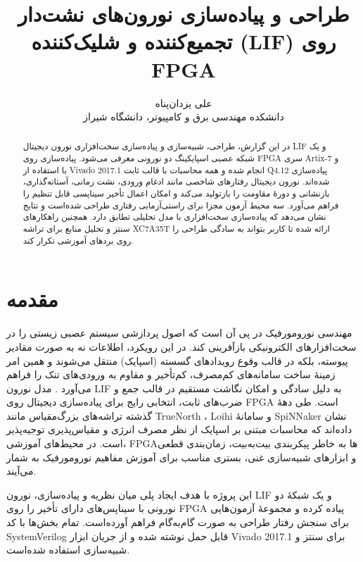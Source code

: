 \documentclass[12pt,a4paper]{article}
\title{طراحی و پیاده‌سازی نورون‌های نشت‌دار تجمیع‌کننده و شلیک‌کننده (LIF) روی FPGA}
\author{علی یزدان‌پناه\\
دانشکده مهندسی برق و کامپیوتر، دانشگاه شیراز}
\date{}
\begin{document}
\maketitle

\begin{abstract}
در این گزارش، طراحی، شبیه‌سازی و پیاده‌سازی سخت‌افزاری نورون دیجیتال LIF و یک شبکه عصبی اسپایکینگ دو نورونی معرفی می‌شود. پیاده‌سازی روی FPGA سری Artix-7 و با استفاده از Vivado 2017.1 انجام شده و همه محاسبات با قالب ثابت Q4.12 پیاده‌سازی شده‌اند. نورون دیجیتال رفتارهای شاخصی مانند ادغام ورودی، نشت زمانی، آستانه‌گذاری، بازنشانی و دورهٔ مقاومت را بازتولید می‌کند و امکان اعمال تأخیر سیناپسی قابل تنظیم را فراهم می‌آورد. سه محیط آزمون مجزا برای راستی‌آزمایی رفتاری طراحی شده‌است و نتایج نشان می‌دهد که پیاده‌سازی سخت‌افزاری با مدل تحلیلی تطابق دارد. همچنین راهکارهای سنتز و تحلیل منابع برای تراشه XC7A35T ارائه شده تا کاربر بتواند به سادگی طراحی را روی بردهای آموزشی تکرار کند.
\end{abstract}

\section{مقدمه}
مهندسی نورومورفیک در پی آن است که اصول پردازشی سیستم عصبی زیستی را در سخت‌افزارهای الکترونیکی بازآفرینی کند. در این رویکرد، اطلاعات نه به صورت مقادیر پیوسته، بلکه در قالب وقوع رویدادهای گسسته (اسپایک) منتقل می‌شوند و همین امر زمینهٔ ساخت سامانه‌های کم‌مصرف، کم‌تأخیر و مقاوم به ورودی‌های تنک را فراهم می‌آورد \cite{GerstnerKistler2002,Maass1997}. مدل نورون LIF به دلیل سادگی و امکان نگاشت مستقیم در قالب جمع و ضرب‌های ثابت، انتخابی رایج برای پیاده‌سازی دیجیتال روی FPGA است. طی دههٔ گذشته تراشه‌های بزرگ‌مقیاس مانند TrueNorth \cite{Merolla2014}، Loihi \cite{Davies2018} و سامانهٔ SpiNNaker \cite{Furber2014} نشان داده‌اند که محاسبات مبتنی بر اسپایک از نظر مصرف انرژی و مقیاس‌پذیری توجیه‌پذیر است. در محیط‌های آموزشی، FPGAها به خاطر پیکربندی بیت‌به‌بیت، زمان‌بندی قطعی و ابزارهای شبیه‌سازی غنی، بستری مناسب برای آموزش مفاهیم نورومورفیک به شمار می‌آیند.

این پروژه با هدف ایجاد پلی میان نظریه و پیاده‌سازی، نورون LIF و یک شبکهٔ دو نورونی با سیناپس‌های دارای تأخیر را روی FPGA پیاده کرده و مجموعهٔ آزمون‌هایی برای سنجش رفتار طراحی به صورت گام‌به‌گام فراهم آورده‌است. تمام بخش‌ها با کد SystemVerilog قابل حمل نوشته شده و از جریان ابزار Vivado 2017.1 برای سنتز و شبیه‌سازی استفاده شده‌است.
\end{document}
